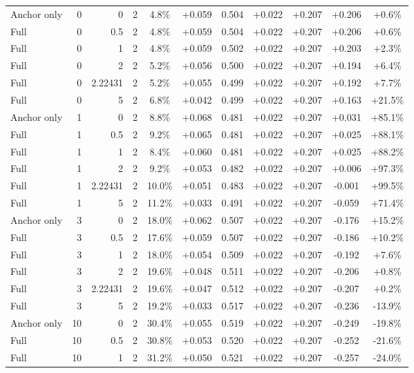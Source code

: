 \begin{table}[htbp]
\begin{tabular}{lrrrccccccc}
Anchor only & 0 & 0 & 2 & 4.8\% & +0.059 & 0.504 & +0.022 & +0.207 & +0.206 & +0.6\% \\
Full & 0 & 0.5 & 2 & 4.8\% & +0.059 & 0.504 & +0.022 & +0.207 & +0.206 & +0.6\% \\
Full & 0 & 1 & 2 & 4.8\% & +0.059 & 0.502 & +0.022 & +0.207 & +0.203 & +2.3\% \\
Full & 0 & 2 & 2 & 5.2\% & +0.056 & 0.500 & +0.022 & +0.207 & +0.194 & +6.4\% \\
Full & 0 & 2.22431 & 2 & 5.2\% & +0.055 & 0.499 & +0.022 & +0.207 & +0.192 & +7.7\% \\
Full & 0 & 5 & 2 & 6.8\% & +0.042 & 0.499 & +0.022 & +0.207 & +0.163 & +21.5\% \\
Anchor only & 1 & 0 & 2 & 8.8\% & +0.068 & 0.481 & +0.022 & +0.207 & +0.031 & +85.1\% \\
Full & 1 & 0.5 & 2 & 9.2\% & +0.065 & 0.481 & +0.022 & +0.207 & +0.025 & +88.1\% \\
Full & 1 & 1 & 2 & 8.4\% & +0.060 & 0.481 & +0.022 & +0.207 & +0.025 & +88.2\% \\
Full & 1 & 2 & 2 & 9.2\% & +0.053 & 0.482 & +0.022 & +0.207 & +0.006 & +97.3\% \\
Full & 1 & 2.22431 & 2 & 10.0\% & +0.051 & 0.483 & +0.022 & +0.207 & -0.001 & +99.5\% \\
Full & 1 & 5 & 2 & 11.2\% & +0.033 & 0.491 & +0.022 & +0.207 & -0.059 & +71.4\% \\
Anchor only & 3 & 0 & 2 & 18.0\% & +0.062 & 0.507 & +0.022 & +0.207 & -0.176 & +15.2\% \\
Full & 3 & 0.5 & 2 & 17.6\% & +0.059 & 0.507 & +0.022 & +0.207 & -0.186 & +10.2\% \\
Full & 3 & 1 & 2 & 18.0\% & +0.054 & 0.509 & +0.022 & +0.207 & -0.192 & +7.6\% \\
Full & 3 & 2 & 2 & 19.6\% & +0.048 & 0.511 & +0.022 & +0.207 & -0.206 & +0.8\% \\
Full & 3 & 2.22431 & 2 & 19.6\% & +0.047 & 0.512 & +0.022 & +0.207 & -0.207 & +0.2\% \\
Full & 3 & 5 & 2 & 19.2\% & +0.033 & 0.517 & +0.022 & +0.207 & -0.236 & -13.9\% \\
Anchor only & 10 & 0 & 2 & 30.4\% & +0.055 & 0.519 & +0.022 & +0.207 & -0.249 & -19.8\% \\
Full & 10 & 0.5 & 2 & 30.8\% & +0.053 & 0.520 & +0.022 & +0.207 & -0.252 & -21.6\% \\
Full & 10 & 1 & 2 & 31.2\% & +0.050 & 0.521 & +0.022 & +0.207 & -0.257 & -24.0\% \\

\end{tabular}
\end{table}
